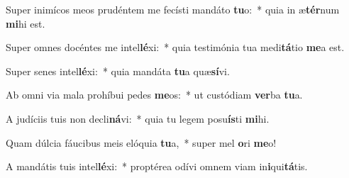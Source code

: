 \item Super inimícos meos prudéntem me fecísti mandáto \textbf{tu}o:~* quia in æ\textbf{tér}num \textbf{mi}hi est.
\item Super omnes docéntes me intel\textbf{lé}xi:~* quia testimónia tua medi\textbf{tá}tio \textbf{me}a est.
\item Super senes intel\textbf{lé}xi:~* quia mandáta \textbf{tu}a quæ\textbf{sí}vi.
\item Ab omni via mala prohíbui pedes \textbf{me}os:~* ut custódiam \textbf{ver}ba \textbf{tu}a.
\item A judíciis tuis non decli\textbf{ná}vi:~* quia tu legem posu\textbf{ís}ti \textbf{mi}hi.
\item Quam dúlcia fáucibus meis elóquia \textbf{tu}a,~* super mel \textbf{o}ri \textbf{me}o!
\item A mandátis tuis intel\textbf{lé}xi:~* proptérea odívi omnem viam in\textbf{i}qui\textbf{tá}tis.

